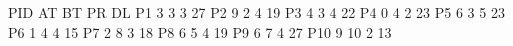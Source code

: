 PID	AT	BT	PR	DL
P1	3	3	3	27
P2	9	2	4	19
P3	4	3	4	22
P4	0	4	2	23
P5	6	3	5	23
P6	1	4	4	15
P7	2	8	3	18
P8	6	5	4	19
P9	6	7	4	27
P10	9	10	2	13
